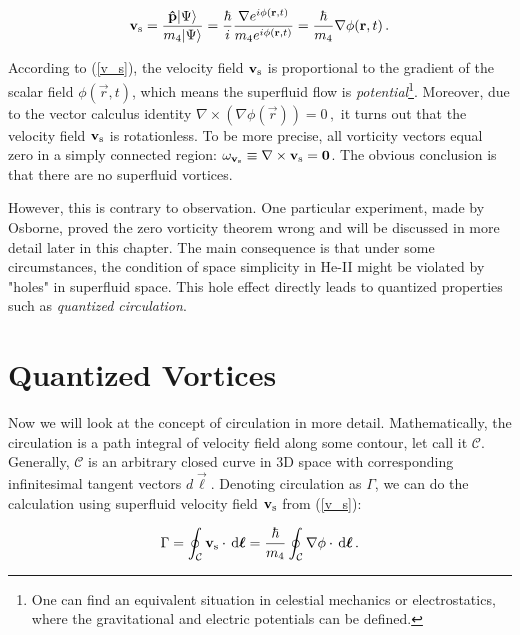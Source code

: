 \begin{equation}
\mathbf{v_{\mathrm{s}}}
= \frac{\mathbf{\hat{p}} \vert\Psi\rangle}{m_4\vert\Psi\rangle}
= \frac{\hbar}{i} \frac{\nabla e^{i \phi(\mathbf{r},t)}}{m_4 e^{i \phi(\mathbf{r},t)}}
= \frac{\hbar}{m_4} \nabla \phi (\mathbf{r},t)\,.
\label{v_s}
\end{equation}

According to (\ref{v_s}), the velocity field $\mathbf{v_{\mathrm{s}}}$ is proportional to the gradient of the scalar field $\phi (\vec{r},t)$, which means the superfluid flow is \textit{potential}\footnote{One can find an equivalent situation in celestial mechanics or electrostatics, where the gravitational and electric potentials can be defined.}.  Moreover, due to the vector calculus identity
$\nabla \times (\nabla \phi(\vec{r}))=0\,,$
it turns out that the velocity field $\mathbf{v_{\mathrm{s}}}$ is rotationless. To be more precise, all vorticity vectors equal zero in a simply connected region: $\omega_{\mathbf{v_{\mathrm{s}}}} \equiv \nabla \times \mathbf{v_{\mathrm{s}}} = \mathbf{0}$. The obvious conclusion is that there are no superfluid vortices.

However, this is contrary to observation. One particular experiment, made by Osborne\cite{osborne}, proved the zero vorticity theorem wrong and will be discussed in more detail later in this chapter. The main consequence is that under some circumstances, the condition of space simplicity in He-II might be violated by "holes" in superfluid space. This hole effect directly leads to quantized properties such as \textit{quantized circulation}.


\section{Quantized Vortices}

Now we will look at the concept of circulation in more detail. Mathematically, the circulation is a path integral of velocity field along some contour, let call it $\mathcal{C}$. Generally, $\mathcal{C}$ is an arbitrary closed curve in 3D space with corresponding infinitesimal tangent vectors $\unit{d}\vec{\boldsymbol{\ell}}$. Denoting circulation as $\Gamma$, we can do the calculation using superfluid velocity field $\mathbf{v_{\mathrm{s}}}$ from (\ref{v_s}):

\begin{equation}
\Gamma = \oint_{\mathcal{C}} \mathbf{v_{\mathrm{s}}} \cdot \,\mathrm{d}\mathbf{\boldsymbol{\ell}}
= \frac{\hbar}{m_4} \oint_{\mathcal{C}} \nabla \phi \cdot \,\mathrm{d} \mathbf{\boldsymbol{\ell}}\,.
\label{gamma}
\end{equation}

